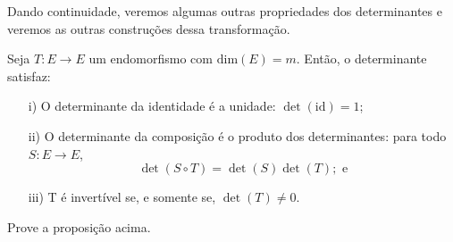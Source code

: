 \documentclass[../differential_forms.tex]{subfiles}
\begin{document}
Dando continuidade, veremos algumas outras propriedades dos determinantes e veremos as outras construções dessa transformação.
\begin{prop*}
	Seja \(T:E\rightarrow E\) um endomorfismo com \(\mathrm{dim}(E)=m\). Então, o determinante satisfaz:
	\begin{itemize}
		\item[i)] O determinante da identidade é a unidade: \(\det{(\mathrm{id})}=1\);
		\item[ii)] O determinante da composição é o produto dos determinantes: para todo \(S:E\rightarrow E\),
		      \[
			      \det{(S\circ T)}=\det{(S)}\det{(T)}; \text{ e}
		      \]
		\item[iii)] T é invertível se, e somente se, \(\det{(T)}\neq 0\).
	\end{itemize}
\end{prop*}
%
%
\begin{exr}
	Prove a proposição acima.
\end{exr}
\end{document}
